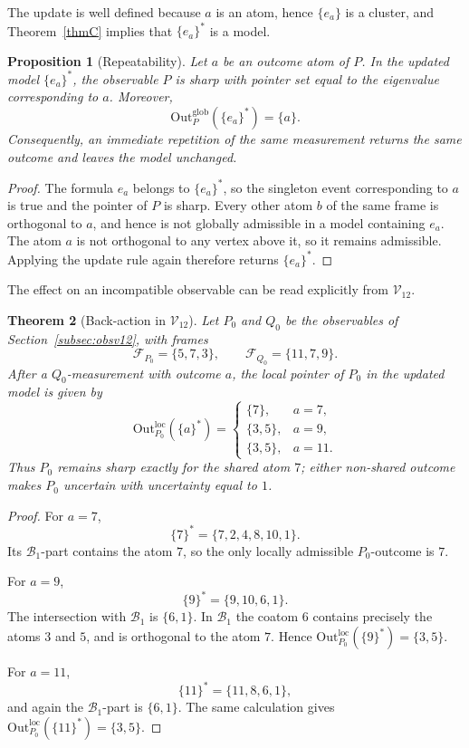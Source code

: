 \documentclass{article}   	%
\theoremstyle{plain}
\newtheorem{theorem}{Theorem}[section]
\newtheorem{proposition}[theorem]{Proposition}
\theoremstyle{definition}
\theoremstyle{remark}
\newcommand{\Outloc}[2]{\mathrm{Out}^{\mathrm{loc}}_{#1}(#2)}
\newcommand{\Outglob}[2]{\mathrm{Out}^{\mathrm{glob}}_{#1}(#2)}
\begin{document}
The update is well defined because $a$ is an atom, hence $\{e_a\}$ is a
cluster, and Theorem~\ref{thmC} implies that $\{e_a\}^*$ is a model.

\begin{proposition}[Repeatability]
\label{prop:repeat}
Let $a$ be an outcome atom of $P$.  In the updated model $\{e_a\}^*$, the
observable $P$ is sharp with pointer set equal to the eigenvalue corresponding
to $a$.  Moreover,
\[
\Outglob{P}{\{e_a\}^*}=\{a\}.
\]
Consequently, an immediate repetition of the same measurement returns the same
outcome and leaves the model unchanged.
\end{proposition}

\begin{proof}
The formula $e_a$ belongs to $\{e_a\}^*$, so the singleton event corresponding
to $a$ is true and the pointer of $P$ is sharp.  Every other atom $b$ of the
same frame is orthogonal to $a$, and hence is not globally admissible in a
model containing $e_a$.  The atom $a$ is not orthogonal to any vertex above it,
so it remains admissible.  Applying the update rule again therefore returns
$\{e_a\}^*$.
\end{proof}

The effect on an incompatible observable can be read explicitly from
$\mathcal V_{12}$.

\begin{theorem}[Back-action in $\mathcal V_{12}$]
\label{thm:backaction}
Let $P_0$ and $Q_0$ be the observables of
Section~\ref{subsec:obsv12}, with frames
\[
\mathcal F_{P_0}=\{5,7,3\},
\qquad
\mathcal F_{Q_0}=\{11,7,9\}.
\]
After a $Q_0$-measurement with outcome $a$, the local pointer of $P_0$ in the
updated model is given by
\[
\Outloc{{P_0}}{\{a\}^*}=
\begin{cases}
\{7\}, & a=7,\\
\{3,5\}, & a=9,\\
\{3,5\}, & a=11.
\end{cases}
\]
Thus $P_0$ remains sharp exactly for the shared atom $7$; either non-shared
outcome makes $P_0$ uncertain with uncertainty equal to $1$.
\end{theorem}

\begin{proof}
For $a=7$,
\[
\{7\}^*=\{7,2,4,8,10,1\}.
\]
Its $\mathcal B_1$-part contains the atom $7$, so the only locally admissible
$P_0$-outcome is $7$.

For $a=9$,
\[
\{9\}^*=\{9,10,6,1\}.
\]
The intersection with $\mathcal B_1$ is $\{6,1\}$.  In $\mathcal B_1$ the
coatom $6$ contains precisely the atoms $3$ and $5$, and is orthogonal to the
atom $7$.  Hence
$\Outloc{{P_0}}{\{9\}^*}=\{3,5\}$.

For $a=11$,
\[
\{11\}^*=\{11,8,6,1\},
\]
and again the $\mathcal B_1$-part is $\{6,1\}$.  The same calculation gives
$\Outloc{{P_0}}{\{11\}^*}=\{3,5\}$.
\end{proof}
\end{document}
